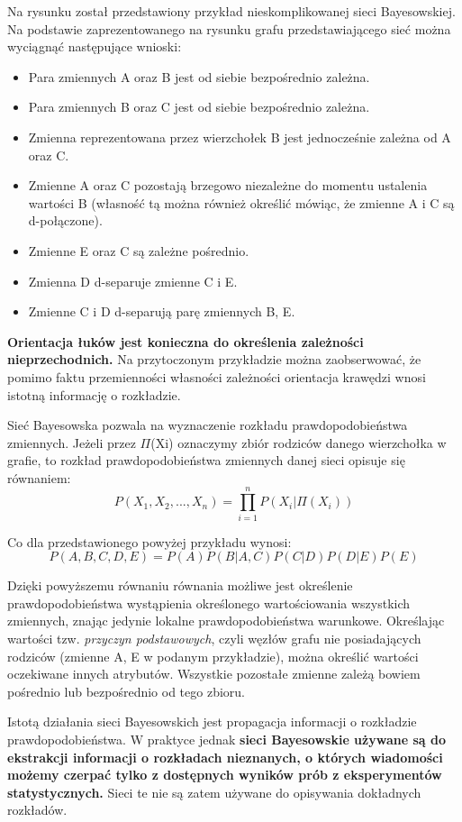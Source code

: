 Na rysunku został przedstawiony przykład nieskomplikowanej sieci Bayesowskiej. Na podstawie zaprezentowanego na rysunku grafu przedstawiającego sieć można wyciągnąć następujące wnioski:
\begin{itemize}
\item Para zmiennych A oraz B jest od siebie bezpośrednio zależna.
\item Para zmiennych B oraz C jest od siebie bezpośrednio zależna.
\item Zmienna reprezentowana przez wierzchołek B jest jednocześnie zależna od A oraz C.
\item Zmienne A oraz C pozostają brzegowo niezależne do momentu ustalenia wartości B (własność tą można również określić mówiąc, że zmienne A i C są d-połączone).
\item Zmienne E oraz C są zależne pośrednio.
\item Zmienna D d-separuje zmienne C i E.
\item Zmienne C i D d-separują parę zmiennych B, E.
\end{itemize}

\textbf{Orientacja łuków jest konieczna do określenia zależności nieprzechodnich.} Na przytoczonym przykładzie można zaobserwować, że pomimo faktu przemienności własności zależności orientacja krawędzi wnosi istotną informację o rozkładzie.\newline

Sieć Bayesowska pozwala na wyznaczenie rozkładu prawdopodobieństwa zmiennych. Jeżeli przez \(\Pi\)(Xi) oznaczymy zbiór rodziców danego wierzchołka w grafie, to rozkład prawdopodobieństwa zmiennych danej sieci opisuje się równaniem:
$$ P(X_{1}, X_{2}, ... , X_{n}) = \prod _{i=1}^{n}P(X_{i} | \Pi (X_{i})) $$

Co dla przedstawionego powyżej przykładu wynosi:
$$ P(A,B,C,D,E) = P(A)P(B|A,C)P(C|D)P(D|E)P(E) $$ 

Dzięki powyższemu równaniu równania możliwe jest określenie prawdopodobieństwa wystąpienia określonego wartościowania wszystkich zmiennych, znając jedynie lokalne prawdopodobieństwa warunkowe. Określając wartości tzw. \textit{przyczyn podstawowych}, czyli węzłów grafu nie posiadających rodziców (zmienne A, E w podanym przykładzie), można określić wartości oczekiwane innych atrybutów. Wszystkie pozostałe zmienne zależą bowiem pośrednio lub bezpośrednio od tego zbioru.

Istotą działania sieci Bayesowskich jest propagacja informacji o rozkładzie prawdopodobieństwa. 
W praktyce jednak \textbf{sieci Bayesowskie używane są do ekstrakcji informacji o rozkładach nieznanych, o których wiadomości możemy czerpać tylko z dostępnych wyników prób z eksperymentów statystycznych.} Sieci te nie są zatem używane do opisywania dokładnych rozkładów.

